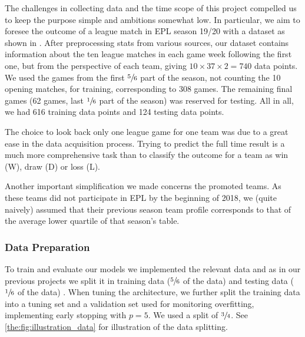 
        The challenges in collecting data and the time scope of this project compelled us to keep the purpose simple and ambitions somewhat low. In particular, we aim to foresee the outcome of a league match in EPL season 19/20 with a dataset as shown in . After preprocessing stats from various sources, our dataset contains information about the ten league matches in each game week following the first one, but from the perspective of each team, giving $ 10 \times 37\times 2 = 740$ data points. We used the games from the first $\sfrac{5}{6}$ part of the season, not counting the 10 opening matches, for training, corresponding to 308 games. The remaining final games (62 games, last $\sfrac{1}{6}$ part of the season) was reserved for testing. 
        All in all, we had 616 training data points and 124 testing data points.
        
        The choice to look back only one league game for one team was due to a great ease in the data acquisition process. Trying to predict the full time result is a much more comprehensive task than to classify the outcome for a team as win (W), draw (D) or loss (L).

        Another important simplification we made concerns the promoted teams. As these teams did not participate in EPL by the beginning of 2018, we (quite naively) assumed that their previous season team profile corresponds to that of the average lower quartile of that season's table.  

        

        




    \subsubsection{Data Preparation}
        To train and evaluate our models we implemented the relevant data and as in our previous projects we split it in training data ($\sfrac{5}{6}$ of the data) and testing data ($\sfrac{1}{6}$ of the data) \citep{Project1, Project2}. When tuning the architecture, we further split the training data into a tuning set and a validation set used for monitoring overfitting, implementing early stopping with $p=5$. We used a split of $\sfrac{3}{4}$. See \cref{the:fig:illustration_data} for illustration of the data splitting. 

